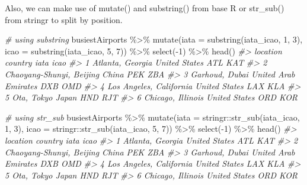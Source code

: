 \documentclass[
]{book}
\newenvironment{Shaded}{\begin{snugshade}}{\end{snugshade}}
\newcommand{\AttributeTok}[1]{\textcolor[rgb]{0.77,0.63,0.00}{#1}}
\newcommand{\CommentTok}[1]{\textcolor[rgb]{0.56,0.35,0.01}{\textit{#1}}}
\newcommand{\DecValTok}[1]{\textcolor[rgb]{0.00,0.00,0.81}{#1}}
\newcommand{\FunctionTok}[1]{\textcolor[rgb]{0.00,0.00,0.00}{#1}}
\newcommand{\NormalTok}[1]{#1}
\newcommand{\SpecialCharTok}[1]{\textcolor[rgb]{0.00,0.00,0.00}{#1}}
\begin{document}
Also, we can make use of mutate() and substring() from base R or str\_sub() from stringr to split by position.

\begin{Shaded}
\begin{Highlighting}[]
\CommentTok{\# using substring}
\NormalTok{busiestAirports }\SpecialCharTok{\%\textgreater{}\%}
  \FunctionTok{mutate}\NormalTok{(}\AttributeTok{iata =} \FunctionTok{substring}\NormalTok{(iata\_icao, }\DecValTok{1}\NormalTok{, }\DecValTok{3}\NormalTok{), }\AttributeTok{icao =} \FunctionTok{substring}\NormalTok{(iata\_icao, }\DecValTok{5}\NormalTok{, }\DecValTok{7}\NormalTok{)) }\SpecialCharTok{\%\textgreater{}\%}
  \FunctionTok{select}\NormalTok{(}\SpecialCharTok{{-}}\DecValTok{1}\NormalTok{) }\SpecialCharTok{\%\textgreater{}\%}
  \FunctionTok{head}\NormalTok{()}
\CommentTok{\#\textgreater{}                   location              country iata icao}
\CommentTok{\#\textgreater{} 1         Atlanta, Georgia        United States  ATL  KAT}
\CommentTok{\#\textgreater{} 2 Chaoyang{-}Shunyi, Beijing                China  PEK  ZBA}
\CommentTok{\#\textgreater{} 3           Garhoud, Dubai United Arab Emirates  DXB  OMD}
\CommentTok{\#\textgreater{} 4  Los Angeles, California        United States  LAX  KLA}
\CommentTok{\#\textgreater{} 5               Ota, Tokyo                Japan  HND  RJT}
\CommentTok{\#\textgreater{} 6        Chicago, Illinois        United States  ORD  KOR}

\CommentTok{\# using str\_sub}
\NormalTok{busiestAirports }\SpecialCharTok{\%\textgreater{}\%}
  \FunctionTok{mutate}\NormalTok{(}\AttributeTok{iata =}\NormalTok{ stringr}\SpecialCharTok{::}\FunctionTok{str\_sub}\NormalTok{(iata\_icao, }\DecValTok{1}\NormalTok{, }\DecValTok{3}\NormalTok{), }\AttributeTok{icao =}\NormalTok{ stringr}\SpecialCharTok{::}\FunctionTok{str\_sub}\NormalTok{(iata\_icao, }\DecValTok{5}\NormalTok{, }\DecValTok{7}\NormalTok{)) }\SpecialCharTok{\%\textgreater{}\%}
  \FunctionTok{select}\NormalTok{(}\SpecialCharTok{{-}}\DecValTok{1}\NormalTok{) }\SpecialCharTok{\%\textgreater{}\%}
  \FunctionTok{head}\NormalTok{()}
\CommentTok{\#\textgreater{}                   location              country iata icao}
\CommentTok{\#\textgreater{} 1         Atlanta, Georgia        United States  ATL  KAT}
\CommentTok{\#\textgreater{} 2 Chaoyang{-}Shunyi, Beijing                China  PEK  ZBA}
\CommentTok{\#\textgreater{} 3           Garhoud, Dubai United Arab Emirates  DXB  OMD}
\CommentTok{\#\textgreater{} 4  Los Angeles, California        United States  LAX  KLA}
\CommentTok{\#\textgreater{} 5               Ota, Tokyo                Japan  HND  RJT}
\CommentTok{\#\textgreater{} 6        Chicago, Illinois        United States  ORD  KOR}
\end{Highlighting}
\end{Shaded}
\end{document}
